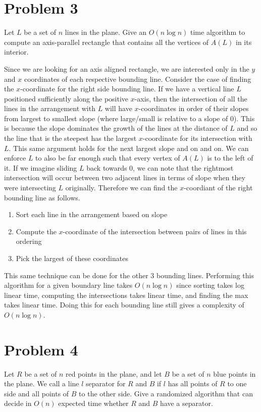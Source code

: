 \documentclass[12pt]{extarticle}
\begin{document}
\section*{Problem 3}
Let $L$ be a set of $n$ lines in the plane. Give an $O(n \log n)$ time algorithm to compute an axis-parallel rectangle that contains all the vertices of $A(L)$ in its interior.

\begin{solution}
    Since we are looking for an axis aligned rectangle, we are interested only in the $y$ and $x$ coordinates of each respective bounding line. Consider the case of finding the $x$-coordinate for the right side bounding line. If we have a vertical line $L$ positioned sufficiently along the positive $x$-axis, then the intersection of all the lines in the arrangement with $L$ will have $x$-coordinates in order of their slopes from largest to smallest slope (where large/small is relative to a slope of $0$). This is because the slope dominates the growth of the lines at the distance of $L$ and so the line that is the steepest has the largest $x$-coordinate for its intersection with $L$. This same argument holds for the next largest slope and on and on. We can enforce $L$ to also be far enough such that every vertex of $A(L)$ is to the left of it. If we imagine sliding $L$ back towards $0$, we can note that the rightmost intersection will occur between two adjacent lines in terms of slope when they were intersecting $L$ originally. Therefore we can find the $x$-coordiant of the right bounding line as follows.
    \begin{enumerate}
        \item Sort each line in the arrangement based on slope
        \item Compute the $x$-coordinate of the intersection between pairs of lines in this ordering
        \item Pick the largest of these coordinates
    \end{enumerate}
    This same technique can be done for the other $3$ bounding lines. Performing this algorithm for a given boundary line takes $O(n \log n)$ since sorting takes log linear time, computing the intersections takes linear time, and finding the max takes linear time. Doing this for each bounding line still gives a complexity of $O(n \log n)$.
\end{solution}

\section*{Problem 4}
Let $R$ be a set of $n$ red points in the plane, and let $B$ be a set of $n$ blue points in the plane. We call a line $l$ separator for $R$ and $B$ if $l$ has all points of $R$ to one side and all points of $B$ to the other side. Give a randomized algorithm that can decide in $O(n)$ expected time whether $R$ and $B$ have a separator.
\end{document}
